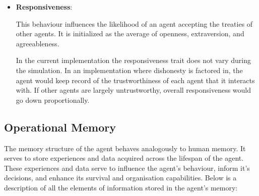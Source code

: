 \begin{itemize}
    \item  \textbf{Responsiveness}: 
    
    This behaviour influences the likelihood of an agent accepting the treaties of other agents. It is initialized as the average of openness, extraversion, and agreeableness. 
    
    In the current implementation the responsiveness trait does not vary during the simulation. In an implementation where dishonesty is factored in, the agent would keep record of the trustworthiness of each agent that it interacts with. If other agents are largely untrustworthy, overall responsiveness would go down proportionally. 
    
\end{itemize}

\subsection{Operational Memory}
\label{subsec: Operational Memory}
The memory structure of the agent behaves analogously to human memory. It serves to store experiences and data acquired across the lifespan of the agent. These experiences and data serve to influence the agent's behaviour, inform it's decisions, and enhance its survival and organisation capabilities. 
Below is a description of all the elements of information stored in the agent's memory:

